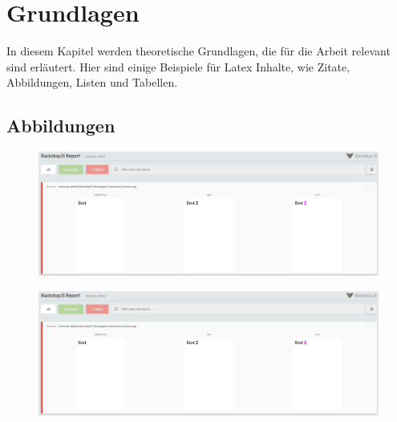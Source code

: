 \chapter[Grundlagen]{Grundlagen}
\label{chap:definitions}

In diesem Kapitel werden theoretische Grundlagen, die für die Arbeit relevant sind erläutert. Hier sind einige Beispiele für Latex Inhalte, wie Zitate, Abbildungen, Listen und Tabellen.

\section{Abbildungen}

\begin{figure}[h]
    \includegraphics[width=1\linewidth]{src/Backstop.png}
    \centering
    \label{fig:backstopjs}
\end{figure}

\begin{landscape}
    \begin{figure}[h]
        \includegraphics[width=1\linewidth]{src/Backstop.png}
        \centering
        \label{fig:landscape-backstopjs}
    \end{figure}
\end{landscape}


